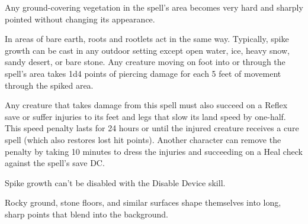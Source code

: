 \begin{multicols}{2}
\begin{small}

\noindent Any ground-covering vegetation in the spell's area becomes very hard and sharply pointed without changing its appearance.

\smallskip\noindent In areas of bare earth, roots and rootlets act in the same way. Typically, spike growth can be cast in any outdoor setting except open water, ice, heavy snow, sandy desert, or bare stone. Any creature moving on foot into or through the spell's area takes 1d4 points of piercing damage for each 5 feet of movement through the spiked area.

\smallskip\noindent Any creature that takes damage from this spell must also succeed on a Reflex save or suffer injuries to its feet and legs that slow its land speed by one-half. This speed penalty lasts for 24 hours or until the injured creature receives a cure spell (which also restores lost hit points). Another character can remove the penalty by taking 10 minutes to dress the injuries and succeeding on a Heal check against the spell's save DC.

\smallskip\noindent Spike growth can't be disabled with the Disable Device skill.


\noindent Rocky ground, stone floors, and similar surfaces shape themselves into long, sharp points that blend into the background.


\end{small}
\end{multicols}
